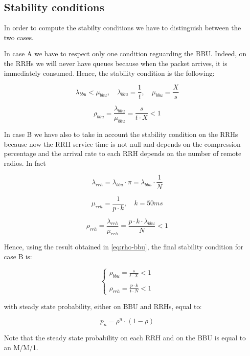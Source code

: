 \documentclass[11pt,a4paper,oneside, openright]{article}
\begin{document}
\subsection{Stability conditions}
In order to compute the stabilty conditions we have to distinguish between the two cases.

In case A we have to respect only one condition reguarding the BBU. Indeed, on the RRHs we will never have queues because when the packet arrives, it is immediately consumed.
Hence, the stability condition is the following:

$$ \lambda_{bbu} < \mu_{bbu}, \quad \lambda_{bbu} = \frac{1}{t}, \quad \mu_{bbu} = \frac{X}{s}$$

\begin{equation} \label{eq:rho-bbu}
\rho_{bbu} = \frac{\lambda_{bbu}}{\mu_{bbu}} = \frac{s}{t \cdot X} < 1
\end{equation}

In case B we have also to take in account the stability condition on the RRHs because now the RRH service time is not null and depends on the compression percentage and the arrival rate to each RRH depends on the number of remote radios. In fact

$$ \lambda_{rrh} = \lambda_{bbu} \cdot \pi = \lambda_{bbu} \cdot \frac{1}{N} $$

$$ \mu_{rrh} = \frac{1}{p \cdot k}, \quad k = 50ms $$

\begin{equation}
\rho_{rrh} = \frac{\lambda_{rrh}}{\mu_{rrh}} = \frac{p \cdot k \cdot \lambda_{bbu}}{N} < 1
\end{equation}

Hence, using the result obtained in \eqref{eq:rho-bbu}, the final stability condition for case B is:

$$ \begin{cases} \rho_{bbu} = \frac{s}{t \cdot X} < 1 \\ \\ \rho_{rrh} = \frac{p \cdot k}{t \cdot N} < 1 \end{cases} $$

with steady state probability, either on BBU and RRHs, equal to:

$$ p_{n} = \rho^n \cdot (1 - \rho) $$

Note that the steady state probability on each RRH and on the BBU is equal to an M/M/1.
\end{document}
